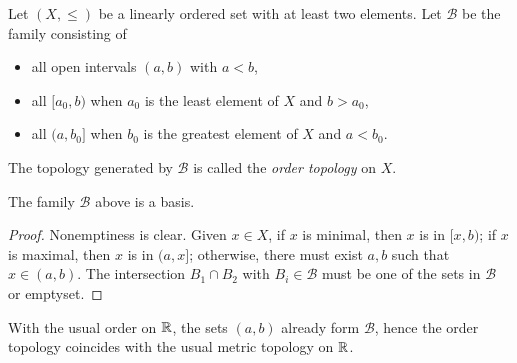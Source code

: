 \begin{definition}
Let $(X,\le)$ be a linearly ordered set with at least two elements. Let $\mathcal B$ be the family consisting of
\begin{itemize}
  \item all open intervals $(a,b)$ with $a<b$,
  \item all $[a_0,b)$ when $a_0$ is the least element of $X$ and $b>a_0$,
  \item all $(a,b_0]$ when $b_0$ is the greatest element of $X$ and $a<b_0$.
\end{itemize}
The topology generated by $\mathcal B$ is called the \emph{order topology} on $X$.
\end{definition}

\begin{proposition}
The family $\mathcal B$ above is a basis.
\end{proposition}
\begin{proof}
Nonemptiness is clear. Given $x\in X$, if $x$ is minimal, then $x$ is in $[x,b)$; if $x$ is maximal, then $x$ is in $(a,x]$; otherwise, there must exist $a,b$ such that $x\in (a,b)$. The intersection $B_1\cap B_2$ with $B_i\in\mathcal B$ must be one of the sets in $\mathcal{B}$ or emptyset.
\end{proof}

\begin{example}
With the usual order on $\mathbb{R}$, the sets $(a,b)$ already form $\mathcal B$, hence the order topology coincides with the usual metric topology on $\mathbb{R}$.
\end{example}

